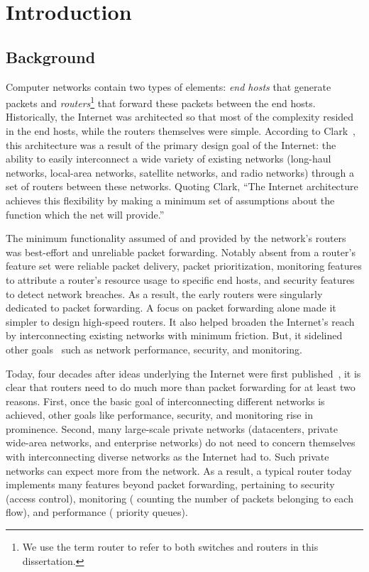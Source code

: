\chapter{Introduction}
\label{chap:intro}

\section{Background}
\label{s:intro_background}
Computer networks contain two types of elements: {\em end hosts} that generate
packets and {\em routers}\footnote{We use the term router to refer to both
switches and routers in this dissertation.} that forward these packets between
the end hosts. Historically, the Internet was architected so that most of the
complexity resided in the end hosts, while the routers themselves were simple.
According to Clark~\cite{design_philosophy}, this architecture was a result of
the primary design goal of the Internet: the ability to easily interconnect a
wide variety of existing networks (\eg long-haul networks, local-area networks,
satellite networks, and radio networks) through a set of routers
 between these networks. Quoting Clark, ``The Internet
architecture achieves this flexibility by making a minimum set of assumptions
about the function which the net will provide.''

The minimum functionality assumed of and provided by the network's routers was
best-effort and unreliable packet forwarding. Notably absent from a router's
feature set were reliable packet delivery, packet prioritization, monitoring
features to attribute a router's resource usage to specific end hosts, and
security features to detect network breaches. As a result, the early routers
were singularly dedicated to packet forwarding. A focus on packet forwarding
alone made it simpler to design high-speed routers. It also helped broaden the
Internet's reach by interconnecting existing networks with minimum friction.
But, it sidelined other goals~\cite{design_philosophy} such as network
performance, security, and monitoring.
 
Today, four decades after ideas underlying the Internet were first
published~\cite{cerf74}, it is clear that routers need to do much more than
packet forwarding for at least two reasons. First, once the basic goal of
interconnecting different networks is achieved, other goals like performance,
security, and monitoring rise in prominence.  Second, many large-scale private
networks (\eg datacenters, private wide-area networks, and enterprise networks) do
not need to concern themselves with interconnecting diverse networks as the
Internet had to. Such private networks can expect more from the network. As a
result, a typical router today implements many features beyond packet
forwarding, pertaining to security (\eg access control), monitoring (\eg
counting the number of packets belonging to each flow), and performance (\eg
priority queues).

